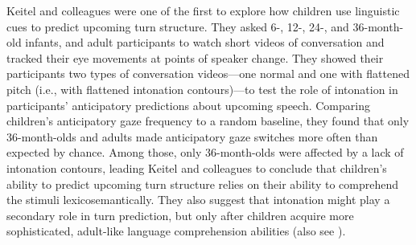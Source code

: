 \documentclass[authoryear, 12pt]{elsarticle}
\begin{document}



Keitel and colleagues \citeyearpar{keitel2013} were one of the first to explore how children use linguistic cues to predict upcoming turn structure. They asked 6-, 12-, 24-, and 36-month-old infants, and adult participants to watch short videos of conversation and tracked their eye movements at points of speaker change. They showed their participants two types of conversation videos---one normal and one with flattened pitch (i.e., with flattened intonation contours)---to test the role of intonation in participants' anticipatory predictions about upcoming speech. Comparing children's anticipatory gaze frequency to a random baseline, they found that only 36-month-olds and adults made anticipatory gaze switches more often than expected by chance. Among those, only 36-month-olds were affected by a lack of intonation contours, leading Keitel and colleagues to conclude that children's ability to predict upcoming turn structure relies on their ability to comprehend the stimuli lexicosemantically. They also suggest that intonation might play a secondary role in turn prediction, but only after children acquire more sophisticated, adult-like language comprehension abilities (also see \citealp{keitel2015}).
\end{document}

